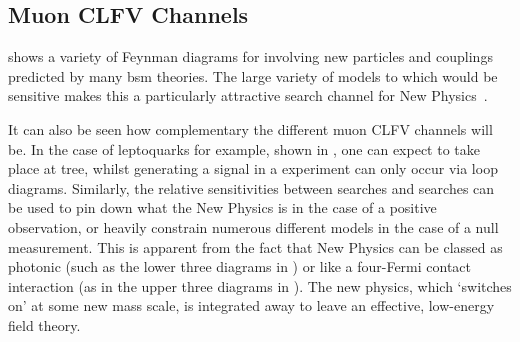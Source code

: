 
\subsection{Muon CLFV Channels}
\FigTheoryMuEConvNewPhysics
{} shows a variety of Feynman diagrams for \mueconv involving new particles and couplings predicted by many \ac{bsm} theories.
The large variety of models to which \mueconv would be sensitive makes this a particularly attractive search channel for New Physics~\cite{Altmannshofer2009ne}.

It can also be seen how complementary the different muon CLFV channels will be.
In the case of leptoquarks for example, shown in , one can expect \mueconv to take place at tree, whilst generating a signal in a \muThreeE experiment can only occur via loop diagrams.
Similarly, the relative sensitivities between \muegamma searches and \mueconv searches can be used to pin down what the New Physics is in the case of a positive observation, or heavily constrain numerous different models in the case of a null measurement.
This is apparent from the fact that New Physics can be classed as photonic (such as the lower three diagrams in ) or like a four-Fermi contact interaction (as in the upper three diagrams in ).
The new physics, which `switches on' at some new mass scale, is integrated away to leave an effective, low-energy field theory.

